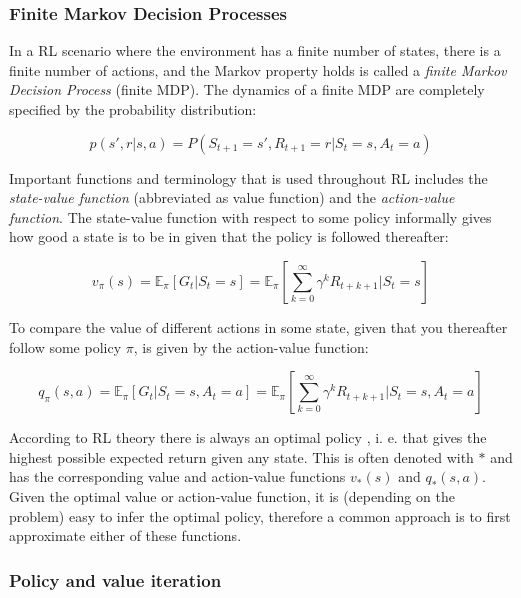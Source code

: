 \subsubsection{Finite Markov Decision Processes}

In a RL scenario where the environment has a finite number of states, there is
a finite number of actions, and the Markov property holds is called a
\textit{finite Markov Decision Process} (finite MDP). The dynamics of a finite
MDP are completely specified by the probability distribution:

\begin{equation}
    p(s', r|s, a) = P(S_{t+1} = s', R_{t+1} = r | S_t = s, A_t = a)
\end{equation}

Important functions and terminology that is used throughout RL includes the
\textit{state-value function} (abbreviated as value function) and the
\textit{action-value function}. The state-value function with respect to some
policy informally gives how good a state is to be in given that
the policy is followed thereafter:

\begin{equation}
    v_\pi(s) = \mathbb{E}_\pi\left[G_t|S_t=s\right] = \mathbb{E}_\pi\left[\sum_{k=0}^\infty \gamma^k R_{t+k+1}|S_t=s\right]
\end{equation}

To compare the value of different actions in some state, given that you thereafter follow some policy $\pi$,
is given by the action-value function:

\begin{equation}
    q_\pi(s, a) = \mathbb{E}_\pi\left[G_t|S_t=s,A_t=a\right] = \mathbb{E}_\pi\left[\sum_{k=0}^\infty \gamma^k R_{t+k+1}|S_t=s,A_t=a\right]
\end{equation}

According to RL theory there is always an optimal policy
\cite{sniedovich1986new}, i. e. that gives the highest possible expected return
given any state. This is often denoted with $*$ and has the corresponding value
and action-value functions $v_*(s)$ and $q_*(s, a)$. Given the optimal value or
action-value function, it is (depending on the problem) easy to infer the
optimal policy, therefore a common approach is to first approximate either of
these functions.

\subsubsection{Policy and value iteration}

